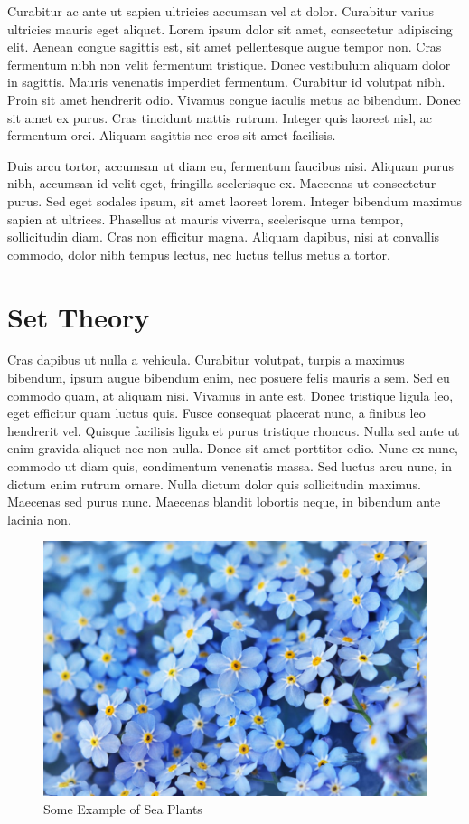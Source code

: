 \documentclass[a4paper, 12pt]{article}
\begin{document}
	Curabitur ac ante ut sapien ultricies accumsan vel at dolor. Curabitur varius ultricies mauris eget aliquet. Lorem ipsum dolor sit amet, consectetur adipiscing elit. Aenean congue sagittis est, sit amet pellentesque augue tempor non. Cras fermentum nibh non velit fermentum tristique. Donec vestibulum aliquam dolor in sagittis. Mauris venenatis imperdiet fermentum. Curabitur id volutpat nibh. Proin sit amet hendrerit odio. Vivamus congue iaculis metus ac bibendum. Donec sit amet ex purus. Cras tincidunt mattis rutrum. Integer quis laoreet nisl, ac fermentum orci. Aliquam sagittis nec eros sit amet facilisis.
	
	Duis arcu tortor, accumsan ut diam eu, fermentum faucibus nisi. Aliquam purus nibh, accumsan id velit eget, fringilla scelerisque ex. Maecenas ut consectetur purus. Sed eget sodales ipsum, sit amet laoreet lorem. Integer bibendum maximus sapien at ultrices. Phasellus at mauris viverra, scelerisque urna tempor, sollicitudin diam. Cras non efficitur magna. Aliquam dapibus, nisi at convallis commodo, dolor nibh tempus lectus, nec luctus tellus metus a tortor.
	
	\section{Set Theory}
	Cras dapibus ut nulla a vehicula. Curabitur volutpat, turpis a maximus bibendum, ipsum augue bibendum enim, nec posuere felis mauris a sem. Sed eu commodo quam, at aliquam nisi. Vivamus in ante est. Donec tristique ligula leo, eget efficitur quam luctus quis. Fusce consequat placerat nunc, a finibus leo hendrerit vel. Quisque facilisis ligula et purus tristique rhoncus. Nulla sed ante ut enim gravida aliquet nec non nulla. Donec sit amet porttitor odio. Nunc ex nunc, commodo ut diam quis, condimentum venenatis massa. Sed luctus arcu nunc, in dictum enim rutrum ornare. Nulla dictum dolor quis sollicitudin maximus. Maecenas sed purus nunc. Maecenas blandit lobortis neque, in bibendum ante lacinia non.
	\begin{figure}[h!]
		\centering
		\includegraphics[scale=.3]{images/f3.jpeg}
		\caption{Some Example of Sea Plants}
		\label{fig:f2}
	\end{figure}
	
\end{document}
